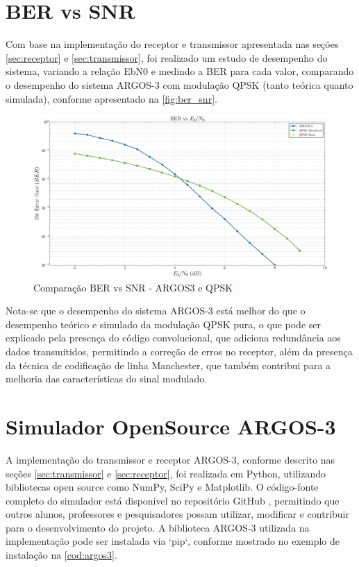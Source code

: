 \begin{apendicesenv}
\chapter{BER vs SNR}

Com base na implementação do receptor e transmissor apresentada nas seções \ref{sec:receptor} e \ref{sec:transmissor}, foi realizado um estudo de desempenho do sistema, variando a relação \gls{EbN0} e medindo a \gls{BER} para cada valor, comparando o desempenho do sistema ARGOS-3 com modulação \gls{QPSK} (tanto teórica quanto simulada), conforme apresentado na \autoref{fig:ber_snr}.

\begin{figure}[H]
	\centering
	\caption{Comparação BER vs SNR - ARGOS3 e QPSK}\label{fig:ber_snr}
	\includegraphics[width=\linewidth]{assets/apendice/ber_vs_ebn0.pdf}
\end{figure}

Nota-se que o desempenho do sistema ARGOS-3 está melhor do que o desempenho teórico e simulado da modulação \gls{QPSK} pura, o que pode ser explicado pela presença do código convolucional, que adiciona redundância aos dados transmitidos, permitindo a correção de erros no receptor, além da presença da técnica de codificação de linha \gls{Manchester}, que também contribui para a melhoria das características do sinal modulado.


\chapter{Simulador OpenSource ARGOS-3}

A implementação do transmissor e receptor ARGOS-3, conforme descrito nas seções \ref{sec:transmissor} e \ref{sec:receptor}, foi realizada em Python, utilizando bibliotecas open source como NumPy, SciPy e Matplotlib. O código-fonte completo do simulador está disponível no repositório GitHub \cite{githubrepository}, permitindo que outros alunos, professores e pesquisadores possam utilizar, modificar e contribuir para o desenvolvimento do projeto. A biblioteca ARGOS-3 utilizada na implementação pode ser instalada via `pip`, conforme mostrado no exemplo de instalação na \autoref{cod:argos3}. 


\end{apendicesenv}
